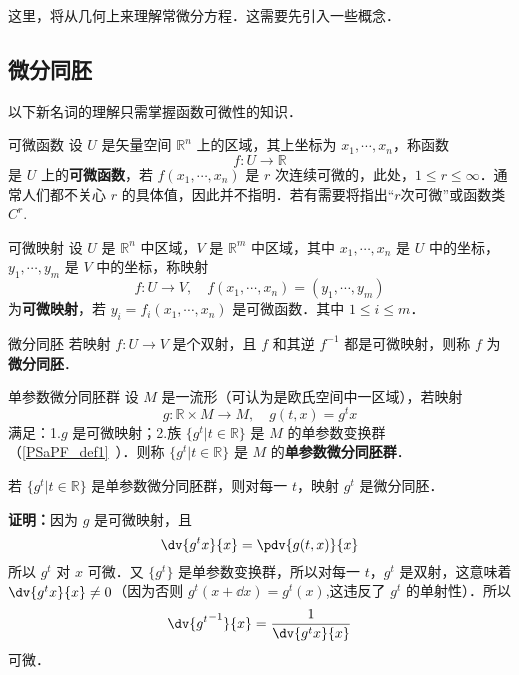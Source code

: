 
\begin{issues}
\issueTODO
\end{issues}

这里，将从几何上来理解常微分方程．这需要先引入一些概念．
\subsection{微分同胚}
以下新名词的理解只需掌握函数可微性的知识．
\begin{definition}{可微函数}
设 $U$ 是矢量空间 $\mathbb R^n$ 上的区域，其上坐标为 $x_1,\cdots,x_n$，称函数
\begin{equation}
f:U\rightarrow\mathbb R
\end{equation}
是 $U$ 上的\textbf{可微函数}，若 $f(x_1,\cdots,x_n)$ 是 $r$ 次连续可微的，此处，$1\leq r\leq\infty$．通常人们都不关心 $r$ 的具体值，因此并不指明．若有需要将指出“$r$次可微”或函数类 $C^r$.
\end{definition}
\begin{definition}{可微映射}
设 $U$ 是 $\mathbb R^n$ 中区域，$V$ 是 $\mathbb R^m$ 中区域，其中 $x_1,\cdots,x_n$ 是 $U$ 中的坐标，$y_1,\cdots,y_m$ 是 $V$ 中的坐标，称映射
\begin{equation}
f:U\rightarrow V,\quad f(x_1,\cdots,x_n)=(y_1,\cdots,y_m)
\end{equation}
为\textbf{可微映射}，若 $y_i=f_i(x_1,\cdots,x_n)$ 是可微函数．其中 $1\leq i\leq m$．
\end{definition}
\begin{definition}{微分同胚}
若映射 $f:U\rightarrow V$ 是个双射，且 $f$ 和其逆 $f^{-1}$ 都是可微映射，则称 $f$ 为\textbf{微分同胚}．
\end{definition}

\begin{definition}{单参数微分同胚群}\label{GofODE_def1}
设 $M$ 是一流形（可认为是欧氏空间中一区域），若映射
\begin{equation}
g:\mathbb R\times M\rightarrow M,\quad g(t,x) =g^t x
\end{equation}
满足：1.$g$ 是可微映射；2.族 $\{g^t|t\in\mathbb R\}$ 是 $M$ 的单参数变换群（\autoref{PSaPF_def1}~）．则称 $\{g^t|t\in\mathbb R\}$ 是 $M$ 的\textbf{单参数微分同胚群}．
\end{definition}
\begin{theorem}{}
若 $\{g^t|t\in\mathbb R\}$ 是单参数微分同胚群，则对每一 $t$，映射 $g^t$ 是微分同胚．
\end{theorem}
\textbf{证明：}因为 $g$ 是可微映射，且
\begin{equation}
\dv{g^tx}{x}=\pdv{g(t,x)}{x}
\end{equation}
所以 $g^t$ 对 $x$ 可微．又 $\{g^t\}$ 是单参数变换群，所以对每一 $t$，$g^t$ 是双射，这意味着 $\dv{g^t x}{x}\neq 0$（因为否则 $g^t(x+\dd x)=g^t(x)$,这违反了 $g^t$ 的单射性）．所以
\begin{equation}
\dv{{g^{t}}^{-1}}{x}=\frac{1}{\dv{g^t x}{x}}
\end{equation}
可微．

